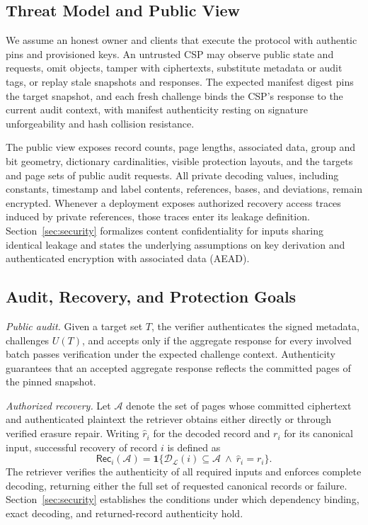 \documentclass[10pt,journal]{IEEEtran}
\begin{document}
\subsection{Threat Model and Public View}
We assume an honest owner and clients that execute the protocol with authentic pins and provisioned keys. An untrusted CSP may observe public state and requests, omit objects, tamper with ciphertexts, substitute metadata or audit tags, or replay stale snapshots and responses. The expected manifest digest pins the target snapshot, and each fresh challenge binds the CSP's response to the current audit context, with manifest authenticity resting on signature unforgeability and hash collision resistance.

The public view exposes record counts, page lengths, associated data, group and bit geometry, dictionary cardinalities, visible protection layouts, and the targets and page sets of public audit requests. All private decoding values, including constants, timestamp and label contents, references, bases, and deviations, remain encrypted. Whenever a deployment exposes authorized recovery access traces induced by private references, those traces enter its leakage definition. Section~\ref{sec:security} formalizes content confidentiality for inputs sharing identical leakage and states the underlying assumptions on key derivation and authenticated encryption with associated data (AEAD).

\subsection{Audit, Recovery, and Protection Goals}
\emph{Public audit.} Given a target set $T$, the verifier authenticates the signed metadata, challenges $U(T)$, and accepts only if the aggregate response for every involved batch passes verification under the expected challenge context. Authenticity guarantees that an accepted aggregate response reflects the committed pages of the pinned snapshot.

\emph{Authorized recovery.} Let $\mathcal A$ denote the set of pages whose committed ciphertext and authenticated plaintext the retriever obtains either directly or through verified erasure repair. Writing $\widehat r_i$ for the decoded record and $r_i$ for its canonical input, successful recovery of record $i$ is defined as
\begin{equation}\label{eq:record-recovery}
\mathsf{Rec}_i(\mathcal A)=
\mathbf1\{\mathcal D_{\mathcal L}(i)\subseteq\mathcal A
\ \land\ \widehat r_i=r_i\}.
\end{equation}
The retriever verifies the authenticity of all required inputs and enforces complete decoding, returning either the full set of requested canonical records or failure. Section~\ref{sec:security} establishes the conditions under which dependency binding, exact decoding, and returned-record authenticity hold.
\end{document}
